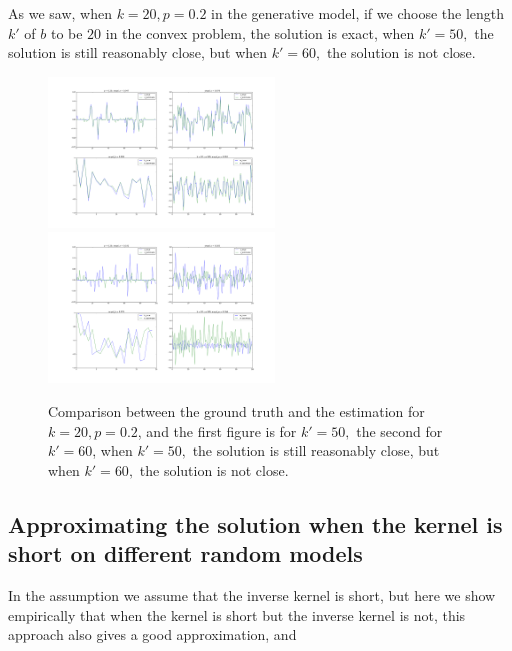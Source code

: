 \documentclass[letter, 10pt]{article}
\numberwithin{equation}{section}
\begin{document}
As we saw, when $k=20, p=0.2$ in the generative model, if we choose the length $k'$ of $b$ to be $20$ in the convex problem, the solution is exact, when $k'= 50,$ the solution is still reasonably close, but when $k'= 60,$ the solution is not close.
\begin{figure}
\includegraphics[width=6cm,keepaspectratio]{fig2/03_bShort_wronglen_xSparse_w_Gaus_AGauss_n100_k20_p0_20_sigma0_00.png}
 \includegraphics[width=6cm,keepaspectratio]{fig2/03_bShort_k_60_len_xSparse_w_Gaus_AGauss_n100_k20_p0_20_sigma0_00.png}
\caption{Comparison between the ground truth and the estimation for $k=20, p=0.2$, and the first figure is for $k'= 50,$ the second for $k'= 60$, when $k'= 50,$ the solution is still reasonably close, but when $k'= 60,$ the solution is not close. }
\end{figure}

\subsection{Approximating the solution when the kernel is short on different random models}
In the assumption we assume that the inverse kernel is short, but here we show empirically that when the kernel is short but the inverse kernel is not, this approach also gives a good approximation, and  
\end{document}
